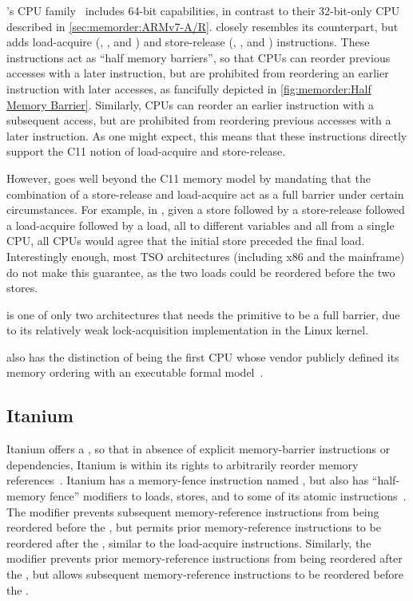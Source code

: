 \ARM's  CPU family~\cite{ARMv8A:2017}
includes 64-bit capabilities,
in contrast to their 32-bit-only CPU described in
\cref{sec:memorder:ARMv7-A/R}.
closely resembles its  counterpart,
but adds load-acquire (, , and )
and store-release (, , and )
instructions.
These instructions act as ``half memory barriers'', so that
 CPUs can reorder previous accesses with a later 
instruction, but are prohibited from reordering an earlier 
instruction with later accesses, as fancifully depicted in
\cref{fig:memorder:Half Memory Barrier}.
Similarly,  CPUs can reorder an earlier  instruction with
a subsequent access, but are prohibited from reordering
previous accesses with a later  instruction.
As one might expect, this means that these instructions directly support
the C11 notion of load-acquire and store-release.

However,  goes well beyond the C11 memory model by mandating that
the combination of a store-release and load-acquire act as a full
barrier under certain circumstances.
For example, in , given a store followed by a store-release followed
a load-acquire followed by a load, all to different variables and all from
a single CPU, all CPUs
would agree that the initial store preceded the final load.
Interestingly enough, most TSO architectures (including x86 and the
mainframe) do not make this guarantee, as the two loads could be
reordered before the two stores.

 is one of only two architectures that needs the
 primitive to be a full barrier,
due to its relatively weak lock-acquisition implementation in
the Linux kernel.

 also has the distinction of being the first CPU whose vendor publicly
defined its memory ordering with an executable formal model~\cite{ARMv8A:2017}.

\subsection{Itanium}
\label{sec:memorder:Itanium}

Itanium offers a 
, so that in absence of explicit
memory-barrier instructions or dependencies, Itanium is within its rights
to arbitrarily reorder memory references~\cite{IntelItanium02v2}.
Itanium has a memory-fence instruction named , but also has
``half-memory fence'' modifiers to loads, stores, and to some of its atomic
instructions~\cite{IntelItanium02v3}.
The  modifier prevents subsequent memory-reference instructions
from being reordered before the , but permits
prior memory-reference instructions to be reordered after the ,
similar to the  load-acquire instructions.
Similarly, the  modifier prevents prior memory-reference
instructions from being reordered after the , but allows
subsequent memory-reference instructions to be reordered before
the .


